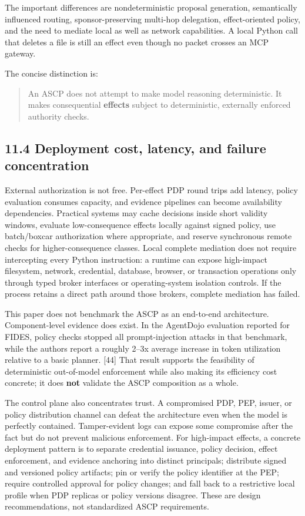 \documentclass[
  10pt,
  letterpaper,
]{article}
\begin{document}
The important differences are nondeterministic proposal generation,
semantically influenced routing, sponsor-preserving multi-hop
delegation, effect-oriented policy, and the need to mediate local as
well as network capabilities. A local Python call that deletes a file is
still an effect even though no packet crosses an MCP gateway.

The concise distinction is:

\begin{quote}
An ASCP does not attempt to make model reasoning deterministic. It makes
consequential \textbf{effects} subject to deterministic, externally
enforced authority checks.
\end{quote}

\subsection{11.4 Deployment cost, latency, and failure
concentration}\label{deployment-cost-latency-and-failure-concentration}

External authorization is not free. Per-effect PDP round trips add
latency, policy evaluation consumes capacity, and evidence pipelines can
become availability dependencies. Practical systems may cache decisions
inside short validity windows, evaluate low-consequence effects locally
against signed policy, use batch/boxcar authorization where appropriate,
and reserve synchronous remote checks for higher-consequence classes.
Local complete mediation does not require intercepting every Python
instruction: a runtime can expose high-impact filesystem, network,
credential, database, browser, or transaction operations only through
typed broker interfaces or operating-system isolation controls. If the
process retains a direct path around those brokers, complete mediation
has failed.

This paper does not benchmark the ASCP as an end-to-end architecture.
Component-level evidence does exist. In the AgentDojo evaluation
reported for FIDES, policy checks stopped all prompt-injection attacks
in that benchmark, while the authors report a roughly 2--3x average
increase in token utilization relative to a basic planner. {[}44{]} That
result supports the feasibility of deterministic out-of-model
enforcement while also making its efficiency cost concrete; it does
\textbf{not} validate the ASCP composition as a whole.

The control plane also concentrates trust. A compromised PDP, PEP,
issuer, or policy distribution channel can defeat the architecture even
when the model is perfectly contained. Tamper-evident logs can expose
some compromise after the fact but do not prevent malicious enforcement.
For high-impact effects, a concrete deployment pattern is to separate
credential issuance, policy decision, effect enforcement, and evidence
anchoring into distinct principals; distribute signed and versioned
policy artifacts; pin or verify the policy identifier at the PEP;
require controlled approval for policy changes; and fall back to a
restrictive local profile when PDP replicas or policy versions disagree.
These are design recommendations, not standardized ASCP requirements.
\end{document}
